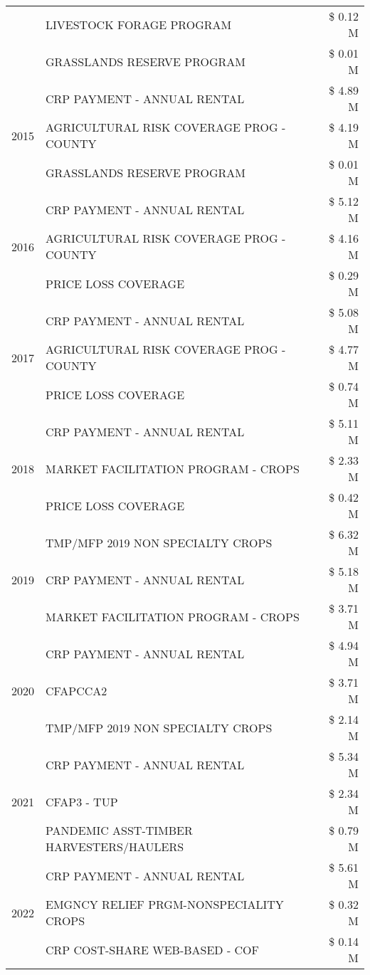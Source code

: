 \begin{tabular}{llr}
 & LIVESTOCK FORAGE PROGRAM & \$ 0.12 M \\
 & GRASSLANDS RESERVE PROGRAM & \$ 0.01 M \\
\cline{1-3}
\multirow[t]{3}{*}{2015} & CRP PAYMENT - ANNUAL RENTAL & \$ 4.89 M \\
 & AGRICULTURAL RISK COVERAGE PROG - COUNTY & \$ 4.19 M \\
 & GRASSLANDS RESERVE PROGRAM & \$ 0.01 M \\
\cline{1-3}
\multirow[t]{3}{*}{2016} & CRP PAYMENT - ANNUAL RENTAL & \$ 5.12 M \\
 & AGRICULTURAL RISK COVERAGE PROG - COUNTY & \$ 4.16 M \\
 & PRICE LOSS COVERAGE & \$ 0.29 M \\
\cline{1-3}
\multirow[t]{3}{*}{2017} & CRP PAYMENT - ANNUAL RENTAL & \$ 5.08 M \\
 & AGRICULTURAL RISK COVERAGE PROG - COUNTY & \$ 4.77 M \\
 & PRICE LOSS COVERAGE & \$ 0.74 M \\
\cline{1-3}
\multirow[t]{3}{*}{2018} & CRP PAYMENT - ANNUAL RENTAL & \$ 5.11 M \\
 & MARKET FACILITATION PROGRAM - CROPS & \$ 2.33 M \\
 & PRICE LOSS COVERAGE & \$ 0.42 M \\
\cline{1-3}
\multirow[t]{3}{*}{2019} & TMP/MFP 2019 NON SPECIALTY CROPS & \$ 6.32 M \\
 & CRP PAYMENT - ANNUAL RENTAL & \$ 5.18 M \\
 & MARKET FACILITATION PROGRAM - CROPS & \$ 3.71 M \\
\cline{1-3}
\multirow[t]{3}{*}{2020} & CRP PAYMENT - ANNUAL RENTAL & \$ 4.94 M \\
 & CFAPCCA2 & \$ 3.71 M \\
 & TMP/MFP 2019 NON SPECIALTY CROPS & \$ 2.14 M \\
\cline{1-3}
\multirow[t]{3}{*}{2021} & CRP PAYMENT - ANNUAL RENTAL & \$ 5.34 M \\
 & CFAP3 - TUP & \$ 2.34 M \\
 & PANDEMIC ASST-TIMBER HARVESTERS/HAULERS & \$ 0.79 M \\
\cline{1-3}
\multirow[t]{3}{*}{2022} & CRP PAYMENT - ANNUAL RENTAL & \$ 5.61 M \\
 & EMGNCY RELIEF PRGM-NONSPECIALITY CROPS & \$ 0.32 M \\
 & CRP COST-SHARE WEB-BASED - COF & \$ 0.14 M \\
\cline{1-3}
\bottomrule
\end{tabular}
